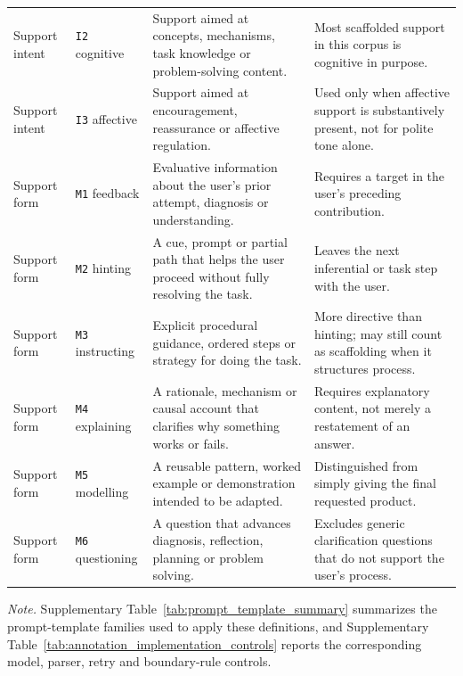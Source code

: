 \begin{table}[t]
\begin{tabularx}{\textwidth}{
>{\raggedright\arraybackslash}p{}
>{\raggedright\arraybackslash}p{}
>{\raggedright\arraybackslash}p{}
>{\raggedright\arraybackslash}X}
Support intent & \texttt{I2} cognitive & Support aimed at concepts, mechanisms, task knowledge or problem-solving content. & Most scaffolded support in this corpus is cognitive in purpose. \\
Support intent & \texttt{I3} affective & Support aimed at encouragement, reassurance or affective regulation. & Used only when affective support is substantively present, not for polite tone alone. \\
\midrule
Support form & \texttt{M1} feedback & Evaluative information about the user's prior attempt, diagnosis or understanding. & Requires a target in the user's preceding contribution. \\
Support form & \texttt{M2} hinting & A cue, prompt or partial path that helps the user proceed without fully resolving the task. & Leaves the next inferential or task step with the user. \\
Support form & \texttt{M3} instructing & Explicit procedural guidance, ordered steps or strategy for doing the task. & More directive than hinting; may still count as scaffolding when it structures process. \\
Support form & \texttt{M4} explaining & A rationale, mechanism or causal account that clarifies why something works or fails. & Requires explanatory content, not merely a restatement of an answer. \\
Support form & \texttt{M5} modelling & A reusable pattern, worked example or demonstration intended to be adapted. & Distinguished from simply giving the final requested product. \\
Support form & \texttt{M6} questioning & A question that advances diagnosis, reflection, planning or problem solving. & Excludes generic clarification questions that do not support the user's process. \\
\bottomrule
\end{tabularx}
\vspace{1mm}
\begin{minipage}{0.96\textwidth}
\footnotesize
\textit{Note.} Supplementary Table~\ref{tab:prompt_template_summary} summarizes the prompt-template families used to apply these definitions, and Supplementary Table~\ref{tab:annotation_implementation_controls} reports the corresponding model, parser, retry and boundary-rule controls.
\end{minipage}
\end{table}
